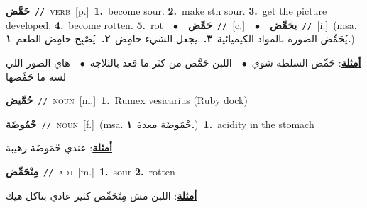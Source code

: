 \documentclass[10pt,a4paper,twoside]{article} %
\begin{document}
\begin{multicols}{2}
{\setlength\topsep{0pt}\textbf{\foreignlanguage{arabic}{حَمَّض}}\ {\color{gray}\texttt{//}\color{black}}\ \textsc{verb}\ [p.]\ \textbf{1.}~become sour.  \textbf{2.}~make sth sour.  \textbf{3.}~get the picture developed.  \textbf{4.}~become rotten.  \textbf{5.}~rot\ \ $\bullet$\ \ \setlength\topsep{0pt}\textbf{\foreignlanguage{arabic}{حَمِّض}}\ {\color{gray}\texttt{//}\color{black}}\ [c.]\ \ $\bullet$\ \ \setlength\topsep{0pt}\textbf{\foreignlanguage{arabic}{يحَمِّض}}\ {\color{gray}\texttt{//}\color{black}}\ [i.]\ \color{gray}(msa. \foreignlanguage{arabic}{يُحَمِّض الصورة بالمواد الكيميائية}~\foreignlanguage{arabic}{\textbf{٣.}}  .\foreignlanguage{arabic}{يجعل الشيء حامِض}~\foreignlanguage{arabic}{\textbf{٢.}}  .\foreignlanguage{arabic}{يُصْبِح حامِض الطعم}~\foreignlanguage{arabic}{\textbf{١.}})\color{black}\  \begin{flushright}\color{gray}\foreignlanguage{arabic}{\textbf{\underline{\foreignlanguage{arabic}{أمثلة}}}: حَمِّض السلطة شوي\ $\bullet$\ \  اللبن حَمَّض من كثر ما قعد بالثلاجة\ $\bullet$\ \  هاي الصور اللي لسة ما حَمَّضها}\end{flushright}\color{black}} \vspace{2mm}

{\setlength\topsep{0pt}\textbf{\foreignlanguage{arabic}{حُمَّيض}}\ {\color{gray}\texttt{//}\color{black}}\ \textsc{noun}\ [m.]\ \textbf{1.}~Rumex vesicarius (Ruby dock)\ } \vspace{2mm}

{\setlength\topsep{0pt}\textbf{\foreignlanguage{arabic}{حْمُوضَة}}\ {\color{gray}\texttt{//}\color{black}}\ \textsc{noun}\ [f.]\ \color{gray}(msa. \foreignlanguage{arabic}{حْمَوضَة معدة}~\foreignlanguage{arabic}{\textbf{١.}})\color{black}\ \textbf{1.}~acidity in the stomach\  \begin{flushright}\color{gray}\foreignlanguage{arabic}{\textbf{\underline{\foreignlanguage{arabic}{أمثلة}}}: عندي حْمَوضَة رهيبة}\end{flushright}\color{black}} \vspace{2mm}

{\setlength\topsep{0pt}\textbf{\foreignlanguage{arabic}{مِتْحَمِّض}}\ {\color{gray}\texttt{//}\color{black}}\ \textsc{adj}\ [m.]\ \textbf{1.}~sour  \textbf{2.}~rotten\  \begin{flushright}\color{gray}\foreignlanguage{arabic}{\textbf{\underline{\foreignlanguage{arabic}{أمثلة}}}: اللبن مش مِتْحَمِّض كثير عادي بتاكل هيك}\end{flushright}\color{black}} \vspace{2mm}


\end{multicols}
\end{document}
